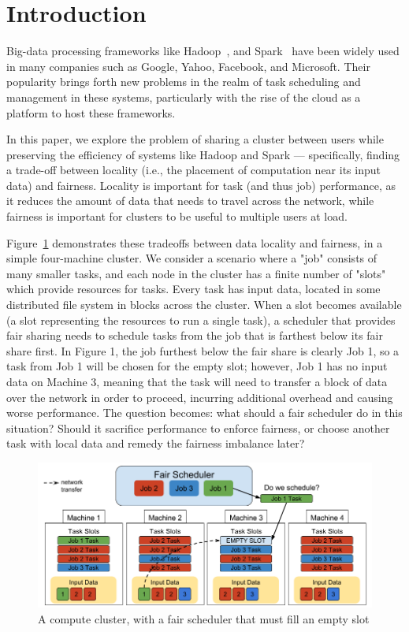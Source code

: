 \section{Introduction}\label{sec:intro}
Big-data processing frameworks like Hadoop~\cite{Shvachko:2010}, and Spark~\cite{Zaharia2012} have been widely 
used in many companies such as Google, Yahoo, Facebook, and Microsoft. Their popularity 
brings forth new problems in the realm of task scheduling and management in these systems,
particularly with the rise of the cloud as a platform to host these frameworks.

In this paper, we explore the problem of sharing a cluster between users while preserving 
the efficiency of systems like Hadoop and Spark --- specifically, finding a trade-off 
between locality (i.e., the placement of computation near its input data) and fairness. 
Locality is important for task (and thus job) performance, as it reduces the amount of data 
that needs to travel across the network, while fairness is important for clusters to be 
useful to multiple users at load. 

Figure~\ref{fig:cluster}  demonstrates these tradeoffs between data locality and fairness,
in a simple four-machine cluster. We consider a
scenario where a "job" consists of many smaller tasks, and each node in the cluster 
has a finite number of "slots" which provide resources for tasks. Every task has input data,
located in some distributed file system in blocks across the cluster. When a slot
becomes available (a slot representing the resources to run a single task),
a scheduler that provides fair sharing needs to schedule tasks from the job 
that is farthest below its fair share first. In Figure 1, the job furthest below
the fair share is clearly Job 1, so a task from Job 1 will be chosen for the empty slot; however,
Job 1 has no input data on Machine 3, meaning that the task will need to transfer a block
of data over the network in order to proceed, incurring additional overhead and causing
worse performance. The question becomes: what should a fair scheduler do
in this situation? Should it sacrifice performance to enforce fairness, or choose another task
with local data and remedy the fairness imbalance later? 

\begin{figure}[t]
        \includegraphics[width=\linewidth]{./fig1.png}
        \caption{A compute cluster, with a fair scheduler that must fill an empty slot}
        \label{fig:cluster}
    \endminipage
\end{figure}

